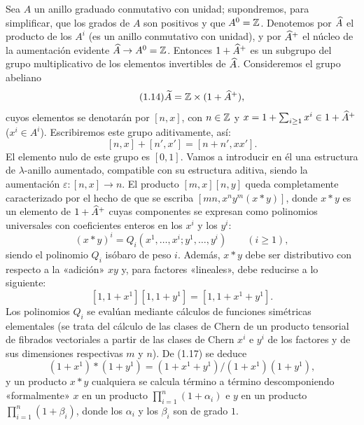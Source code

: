 Sea $A$ un anillo graduado conmutativo con unidad; supondremos, para simplificar, que los grados de $A$ son positivos y que $A^0=\mathbb Z$. Denotemos por $\widehat A$ el producto de los $A^i$ (es un anillo conmutativo con unidad), y por $\widehat A^{+}$ el núcleo de la aumentación evidente $\widehat A\to A^0=\mathbb Z$. Entonces $1+\widehat A^{+}$ es un subgrupo del grupo multiplicativo de los elementos invertibles de $\widehat A$. Consideremos el grupo abeliano
\begin{equation}\tag{1.14}
\widetilde A=\mathbb Z\times(1+\widehat A^{+}),
\end{equation}
cuyos elementos se denotarán por $[n,x]$, con $n\in\mathbb Z$ y $x=1+\sum_{i\geq 1}x^i\in1+\widehat A^{+}$ ($x^i\in A^i$). Escribiremos este grupo aditivamente, así:
\begin{equation}\tag{1.15}
[n,x]+[n',x']=[n+n',xx'].
\end{equation}
El elemento nulo de este grupo es $[0,1]$. Vamos a introducir en él una estructura de $\lambda$-anillo aumentado, compatible con su estructura aditiva, siendo la aumentación $\varepsilon:[n,x]\longrightarrow n$. El producto $[m,x][n,y]$ queda completamente caracterizado por el hecho de que se escriba $[mn,x^n y^m(x*y)]$, donde $x*y$ es un elemento de $1+\widehat A^{+}$ cuyas componentes se expresan como polinomios universales con coeficientes enteros en los $x^i$ y los $y^i$:
\begin{equation}\tag{1.16}
(x*y)^i=Q_i(x^1,\ldots,x^i;y^1,\ldots,y^i)\qquad (i\geq1),
\end{equation}
siendo el polinomio $Q_i$ isóbaro de peso $i$. Además, $x*y$ debe ser distributivo con respecto a la «adición» $xy$ y, para factores «lineales», debe reducirse a lo siguiente:
\begin{equation}\tag{1.17}
[1,1+x^1][1,1+y^1]=[1,1+x^1+y^1].
\end{equation}
Los polinomios $Q_i$ se evalúan mediante cálculos de funciones simétricas elementales (se trata del cálculo de las clases de Chern de un producto tensorial de fibrados vectoriales a partir de las clases de Chern $x^i$ e $y^i$ de los factores y de sus dimensiones respectivas $m$ y $n$). De (1.17) se deduce
\begin{equation}\tag{1.17 bis}
(1+x^1)*(1+y^1)=(1+x^1+y^1)/(1+x^1)(1+y^1),
\end{equation}
y un producto $x*y$ cualquiera se calcula término a término descomponiendo «formalmente» $x$ en un producto $\prod_{i=1}^n(1+\alpha_i)$ e $y$ en un producto $\prod_{i=1}^n(1+\beta_i)$, donde los $\alpha_i$ y los $\beta_i$ son de grado $1$.

